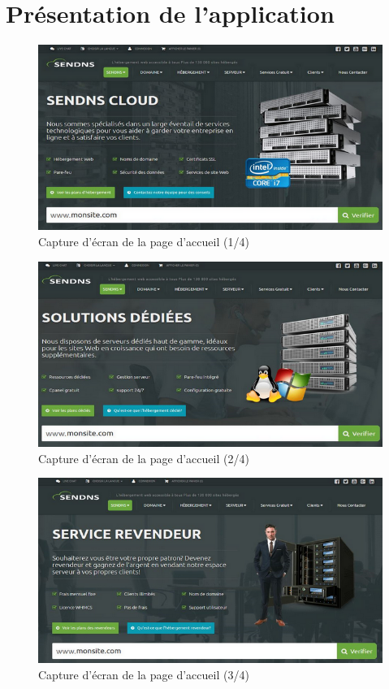 \documentclass[a4paper, 12pt]{report}
\begin{document}
\section{Présentation de l’application}	
\begin{figure}[H]
	\centering
	\includegraphics{img/solution/1}
	\caption{Capture d'écran de la page d'accueil (1/4)}
	\label{Tux}
\end{figure}
\begin{figure}[H]
	\centering
	\includegraphics{img/solution/2}
	\caption{Capture d'écran de la page d'accueil (2/4)}
	\label{Tux}
\end{figure}
\begin{figure}[H]
	\centering
	\includegraphics{img/solution/3}
	\caption{Capture d'écran de la page d'accueil (3/4)}
	\label{Tux}
\end{figure}
\end{document}
